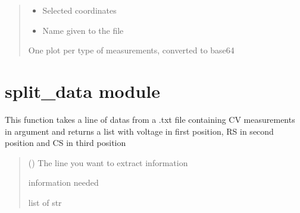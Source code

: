 \documentclass[letterpaper,10pt,english]{sphinxmanual}
\begin{document}
\begin{fulllineitems}
\begin{quote}
\begin{description}
\begin{itemize}
\item {} 
\sphinxAtStartPar
{} \textendash{} Selected coordinates

\item {} 
\sphinxAtStartPar
{} \textendash{} Name given to the file

\end{itemize}

\sphinxAtStartPar
One plot per type of measurements, converted to base64

\end{description}\end{quote}

\end{fulllineitems}


\sphinxstepscope


\section{split\_data module}
\label{\detokenize{split_data:module-split_data}}\label{\detokenize{split_data:split-data-module}}\label{\detokenize{split_data::doc}}

\begin{fulllineitems}
\label{\detokenize{split_data:split_data.C_spliter}}
\pysigstartsignatures
{}
\pysigstopsignatures
\sphinxAtStartPar
This function takes a line of datas from a .txt file containing C\sphinxhyphen{}V measurements in argument and returns a list with voltage in first position, RS in second position and CS in third position
\begin{quote}\begin{description}
\sphinxAtStartPar
{} () \textendash{} The line you want to extract information

\sphinxAtStartPar
information needed

\sphinxAtStartPar
list of str

\end{description}\end{quote}

\end{fulllineitems}
\end{document}
